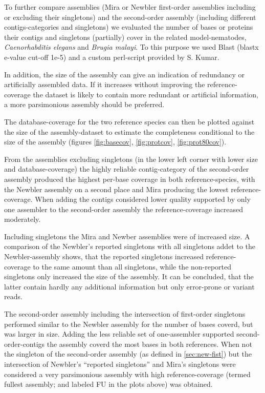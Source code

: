 \documentclass[12pt,a4paper]{article}
\begin{document}
To further compare assemblies (Mira or Newbler first-order assemblies
including or excluding their singletons) and the second-order assembly
(including different contigs-categories and singletons) we evaluated
the number of bases or proteins their contigs and singletons
(partially) cover in the related model-nematodes,
\textit{Caenorhabditis elegans} and \textit{Brugia malayi}. To this
purpose we used Blast (blastx e-value cut-off 1e-5) and a custom
perl-script provided by S. Kumar.

In addition, the size of the assembly can give an indication of
redundancy or artificially assembled data. If it increases without
improving the reference-coverage the dataset is likely to contain more
redundant or artificial information, a more parsimonious assembly
should be preferred.

The database-coverage for the two reference species can then be
plotted against the size of the assembly-dataset to estimate the
completeness conditional to the size of the assembly (figures
\ref{fig:basecov}, \ref{fig:protcov}, \ref{fig:prot80cov}).

From the assemblies excluding singletons (in the lower left corner
with lower size and database-coverage) the highly reliable
contig-category of the second-order assembly produced the highest
per-base coverage in both reference-species, with the Newbler assembly
on a second place and Mira producing the lowest
reference-coverage. When adding the contigs considered lower quality
supported by only one assembler to the second-order assembly the
reference-coverage increased moderately.

Including singletons the Mira and Newber assemblies were of increased
size. A comparison of the Newbler's reported singletons with all
singletons addet to the Newbler-assembly shows, that the reported
singletons increased reference-coverage to the same amount than all
singletons, while the non-reported singletons only increased the size
of the assembly. It can be concluded, that the latter contain hardly
any additional information but only error-prone or variant reads.

The second-order assembly including the intersection of first-order
singletons performed similar to the Newbler assembly for the number of
bases coverd, but was larger in size. Adding the less reliable set of
one-assembler supported second-order-contigs the assembly coverd the
most bases in both references. When not the singleton of the
second-order assembly (as defined in \ref{sec:new-fist}) but the
intersection of Newbler's ``reported singletons'' and Mira's
singletons were considered a very parsimonious assembly with high
reference-coverage (termed fullest assembly; and labeled FU in the
plots above) was obtained.
\end{document}

